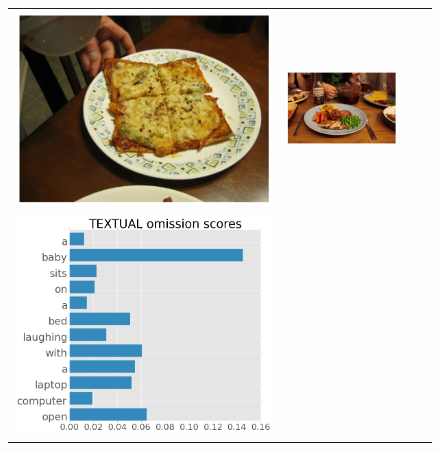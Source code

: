 \begin{figure}[t]
\begin{tabular}{cccc}
    \includegraphics[scale=0.33]{new_omission_examples/img1} & 
    \includegraphics[scale=0.28]{new_omission_examples/img1_omit} \\
    \includegraphics[scale=0.16]{new_omission_examples/textual2} &

\end{tabular}
\end{figure}
